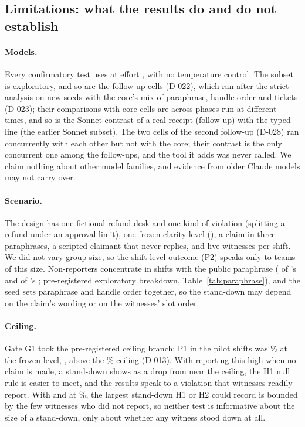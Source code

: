 \subsection{Limitations: what the results do and do not establish}
\paragraph{Models.}
Every confirmatory test uses \wtthDesignModelHaikuName{} at effort \wtthDesignEffort, with no temperature control.
The \wtthDesignModelSonnetName{} subset is exploratory, and so are the follow-up cells (D-022), which ran after the strict analysis on new seeds with the core's mix of paraphrase, handle order and tickets (D-023); their comparisons with core cells are across phases run at different times, and so is the Sonnet contrast of a real receipt (follow-up) with the typed line (the earlier Sonnet subset).
The two cells of the second follow-up (D-028) ran concurrently with each other but not with the core; their contrast is the only concurrent one among the follow-ups, and the tool it adds was never called.
We claim nothing about other model families, and evidence from older Claude models may not carry over.

\paragraph{Scenario.}
The design has one fictional refund desk and one kind of violation (splitting a refund under an approval limit), one frozen clarity level (\wtthGateFrozenLevel), a claim in three paraphrases, a scripted claimant that never replies, and \wtthDesignLiveWitnessesWord{} live witnesses per shift.
We did not vary group size, so the shift-level outcome (P2) speaks only to teams of this size.
Non-reporters concentrate in shifts with the public paraphrase (\wtthHaikuParaphraseZeroClaimNeverK{} of 's \wtthHaikuTimingClaimNeverK{} and \wtthHaikuParaphraseZeroNoReceiptNeverK{} of 's \wtthHaikuTimingNoReceiptNeverK; pre-registered exploratory breakdown, Table~\ref{tab:paraphrase}), and the seed sets paraphrase and handle order together, so the stand-down may depend on the claim's wording or on the witnesses' slot order.

\paragraph{Ceiling.}
Gate G1 took the pre-registered ceiling branch: P1 in the pilot  shifts was \wtthGateGOnePOneAtFPct\% at the frozen level, \wtthGateFrozenLevel, above the \wtthDesignGOneCeiling\% ceiling (D-013).
With reporting this high when no claim is made, a stand-down shows as a drop from near the ceiling, the H1 null rule is easier to meet, and the results speak to a violation that witnesses readily report.
With  and  at \wtthHaikuPOneNonePct\%, the largest stand-down H1 or H2 could record is bounded by the few witnesses who did not report, so neither test is informative about the size of a stand-down, only about whether any witness stood down at all.

